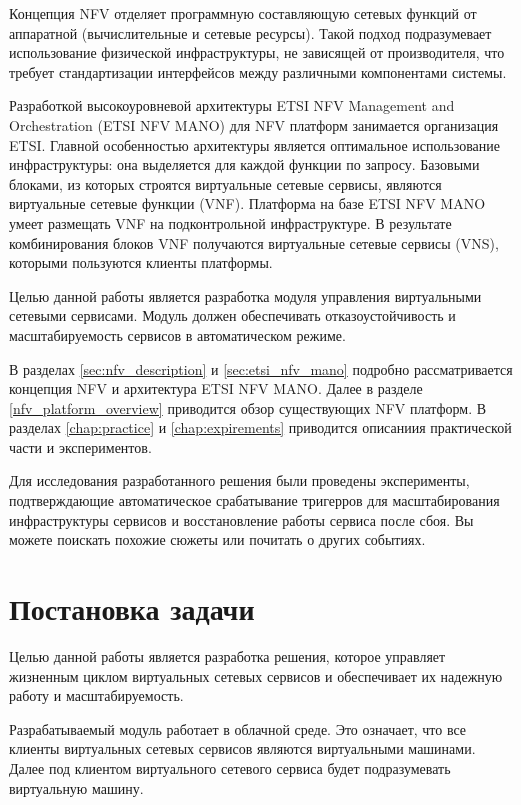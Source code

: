 \documentclass[oneside,final,14pt,a4paper]{extreport}
\begin{document}
Концепция NFV отделяет программную составляющую сетевых функций от аппаратной (вычислительные и сетевые ресурсы). Такой подход подразумевает использование физической инфраструктуры, не зависящей от производителя, что требует стандартизации интерфейсов между различными компонентами системы.

Разработкой высокоуровневой архитектуры ETSI NFV Management and Orchestration (ETSI NFV MANO) для  NFV платформ занимается организация ETSI. Главной особенностью архитектуры является оптимальное использование инфраструктуры: она выделяется для каждой функции по запросу. Базовыми блоками, из которых строятся виртуальные сетевые сервисы, являются виртуальные сетевые функции (VNF). Платформа на базе ETSI NFV MANO умеет размещать VNF на подконтрольной инфраструктуре. В результате комбинирования блоков VNF получаются виртуальные сетевые сервисы (VNS), которыми пользуются клиенты платформы.

Целью данной работы является разработка модуля управления виртуальными сетевыми сервисами. Модуль должен обеспечивать отказоустойчивость и масштабируемость сервисов в автоматическом режиме.

В разделах \ref{sec:nfv_description} и \ref{sec:etsi_nfv_mano} подробно рассматривается концепция NFV и архитектура ETSI NFV MANO. Далее в разделе \ref{nfv_platform_overview} приводится обзор существующих NFV платформ. В разделах \ref{chap:practice} и \ref{chap:expirements} приводится описаниия практической части и экспериментов.

Для исследования разработанного решения были проведены эксперименты, подтверждающие автоматическое срабатывание тригерров для масштабирования инфраструктуры сервисов и восстановление работы сервиса после сбоя.
Вы можете поискать похожие сюжеты или почитать о других событиях.






\chapter{Постановка задачи}
\label{chap:problem_statement}
Целью данной работы является разработка решения, которое управляет жизненным циклом виртуальных сетевых сервисов и обеспечивает их надежную работу и масштабируемость.

Разрабатываемый модуль работает в облачной среде. Это означает, что все клиенты виртуальных сетевых сервисов являются виртуальными машинами. Далее под клиентом виртуального сетевого сервиса будет подразумевать виртуальную машину.
\end{document}
